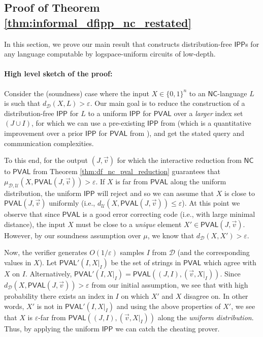 \documentclass[10pt,a4paper]{article}
\newcommand{\NC}{\mathsf{NC}}
\newcommand{\PVAL}{\mathsf{PVAL}}
\newcommand{\IPP}{\mathsf{IPP}}
\newcommand{\sU}{\mathcal{U}}
\newcommand{\sD}{\mathcal{D}}
\begin{document}
\subsection{Proof of Theorem \ref{thm:informal_dfipp_nc_restated}}
\label{sec:proof_main_dfipp}
In this section, we prove our main result that constructs distribution-free $\IPP$s for any language computable by logspace-uniform circuits of low-depth. 

\paragraph*{High level sketch of the proof:} Consider the (soundness) case where the input $X \in \{0,1\}^n$ to an $\NC$-language $L$ is such that $d_{\sD}(X,L)>\varepsilon$. Our main goal is to reduce the construction of a distribution-free $\IPP$ for $L$ to a uniform $\IPP$ for $\PVAL$ over a \textit{larger} index set $(J \cup I)$, for which we can use a pre-existing $\IPP$ from \cite{RR20_batch_polylog} (which is a quantitative improvement over a prior $\IPP$ for $\PVAL$ from \cite{RVW}), and get the stated query and communication complexities.

To this end, for the output $(J,\vec{v})$ for which the interactive reduction from $\NC$ to $\PVAL$ from Theorem \ref{thm:df_nc_pval_reduction} guarantees that $\mu_{\sD, \mathcal{U}}(X,\PVAL(J,\Vec{v})) > \varepsilon$. If $X$ is far from $\PVAL$ along the uniform distribution, the uniform $\IPP$ will reject and so we can assume that $X$ is close to $\PVAL(J,\vec{v})$ uniformly (i.e., $d_{\sU}(X,\PVAL(J,\vec{v}))\leq \varepsilon$). 
At this point we observe that since $\PVAL$ is a good error correcting code (i.e., with large minimal distance), the input $X$ must be close to a \emph{unique} element $X' \in \PVAL(J,\vec{v})$. However, by our soundness assumption over $\mu$, we know that $d_{\sD}(X,X')>\varepsilon$.

Now, the verifier generates $O(1/\varepsilon)$ samples $I$ from $\sD$ (and the corresponding values in $X$). Let $\PVAL'(I, X \vert_I)$ be the set of strings in $\PVAL$ which agree with $X$ on $I$. Alternatively, $\PVAL'(I, X \vert_I) = \PVAL((J, I), (\Vec{v},X \vert_I))$. Since $d_\sD(X,\PVAL(J,\Vec{v})) > \varepsilon$ from our initial assumption, we see that with high probability there exists an index in $I$ on which $X'$ and $X$ disagree on. In other words, $X'$ is not in $\PVAL'(I, X \vert_I)$ and using the above properties of $X'$, we see that $X$ is $\varepsilon$-far from $\PVAL((J, I), (\Vec{v},X \vert_I))$ along the \textit{uniform distribution}. Thus, by applying the uniform $\IPP$ we can catch the cheating prover.
\end{document}
